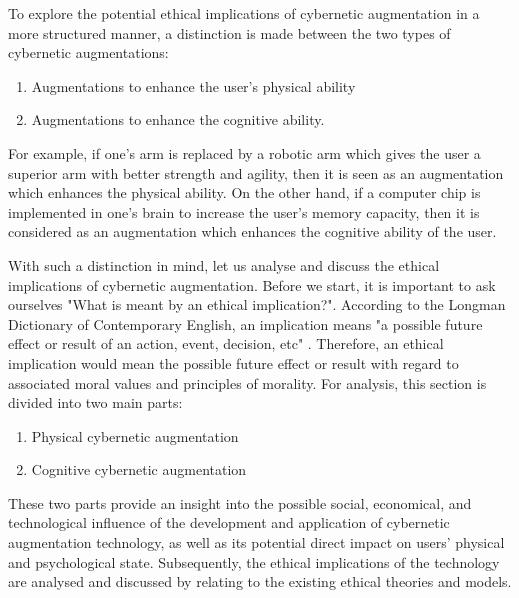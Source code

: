To explore the potential ethical implications of cybernetic augmentation in a more structured manner, a distinction is made between the two types of cybernetic augmentations: 
\begin{enumerate}
	\item Augmentations to enhance the user's physical ability
	\item Augmentations to enhance the cognitive ability.
\end{enumerate}

For example, if one's arm is replaced by a robotic arm which gives the user a superior arm with better strength and agility, then it is seen as an augmentation which enhances the physical ability. On the other hand, if a computer chip is implemented in one's brain to increase the user's memory capacity, then it is considered as an augmentation which enhances the cognitive ability of the user. 

With such a distinction in mind, let us analyse and discuss the ethical implications of cybernetic augmentation. Before we start, it is important to ask ourselves "What is meant by an ethical implication?". According to the Longman Dictionary of Contemporary English, an implication means "a possible future effect or result of an action, event, decision, etc" \cite{Longman_dic}. Therefore, an ethical implication would mean the possible future effect or result with regard to associated moral values and principles of morality. For analysis, this section is divided into two main parts: 

\begin{enumerate}
	\item Physical cybernetic augmentation
	\item Cognitive cybernetic augmentation
\end{enumerate}

These two parts provide an insight into the possible social, economical, and technological influence of the development and application of cybernetic augmentation technology, as well as its potential direct impact on users' physical and psychological state. Subsequently, the ethical implications of the technology are analysed and discussed by relating to the existing ethical theories and models.



